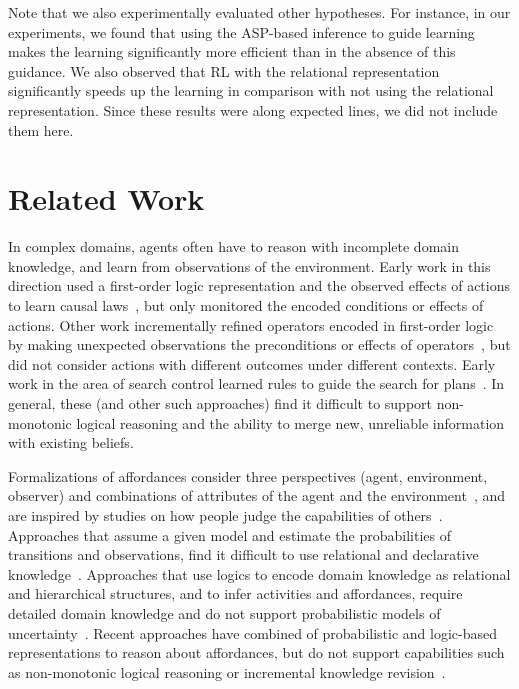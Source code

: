 \documentclass{article}
\begin{document}


Note that we also experimentally evaluated other hypotheses. For
instance, in our experiments, we found that using the ASP-based
inference to guide learning makes the learning significantly more
efficient than in the absence of this guidance. We also observed that
RL with the relational representation significantly speeds up the
learning in comparison with not using the relational representation.
Since these results were along expected lines, we did not include them
here.



\section{Related Work}
\label{sec:relwork}
In complex domains, agents often have to reason with incomplete domain
knowledge, and learn from observations of the environment. Early work
in this direction used a first-order logic representation and the
observed effects of actions to learn causal laws~\cite{shen:ijcai89},
but only monitored the encoded conditions or effects of actions.
Other work incrementally refined operators encoded in first-order
logic by making unexpected observations the preconditions or effects
of operators~\cite{gil:icml94}, but did not consider actions with
different outcomes under different contexts.  Early work in the area
of search control learned rules to guide the search for
plans~\cite{sleeman:AIM82}. In general, these (and other such
approaches) find it difficult to support non-monotonic logical
reasoning and the ability to merge new, unreliable information with
existing beliefs.

Formalizations of affordances consider three perspectives (agent,
environment, observer) and combinations of attributes of the agent and
the environment~\cite{sahin:AB07}, and are inspired by studies on how
people judge the capabilities of others~\cite{ramenzoni:APP10}.
Approaches that assume a given model and estimate the probabilities of
transitions and observations, find it difficult to use relational and
declarative knowledge~\cite{shu:ijcai16}. Approaches that use logics
to encode domain knowledge as relational and hierarchical structures,
and to infer activities and affordances, require detailed domain
knowledge and do not support probabilistic models of
uncertainty~\cite{gabaldon:ijcai09}. Recent approaches have combined
of probabilistic and logic-based representations to reason about
affordances, but do not support capabilities such as non-monotonic
logical reasoning or incremental knowledge
revision~\cite{sarathy:TCDS16}.
\end{document}
